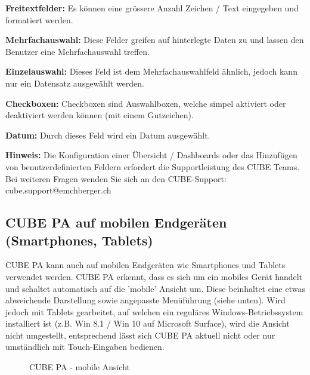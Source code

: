\begin{compactitem}
	\item \textbf{Freitextfelder:} Es können eine grössere Anzahl Zeichen / Text eingegeben und formatiert werden.
	\item \textbf{Mehrfachauswahl:} Diese Felder greifen auf hinterlegte Daten zu und lassen den Benutzer eine Mehrfachauswahl treffen.
	\item \textbf{Einzelauswahl:} Dieses Feld ist dem Mehrfachauswahlfeld ähnlich, jedoch kann nur ein Datensatz ausgewählt werden. 
	\item \textbf{Checkboxen:} Checkboxen sind Auswahlboxen, welche simpel aktiviert oder deaktiviert werden können (mit einem Gutzeichen).
	\item \textbf{Datum:} Durch dieses Feld wird ein Datum ausgewählt.
\end{compactitem}

\vspace{\baselineskip}

\textbf{Hinweis:} Die Konfiguration einer Übersicht / Dashboards oder das Hinzufügen von benutzerdefinierten Feldern erfordert die Supportleistung des CUBE Teams. Bei weiteren Fragen wenden Sie sich an den CUBE-Support: {\color{red} cube.support@emchberger.ch}

\pagebreak
\subsection{CUBE PA auf mobilen Endgeräten (Smartphones, Tablets)}

CUBE PA kann auch auf mobilen Endgeräten wie Smartphones und Tablets verwendet werden. CUBE PA erkennt, dass es sich um ein mobiles Gerät handelt und schaltet automatisch auf die 'mobile' Ansicht um. Diese beinhaltet eine etwas abweichende Darstellung sowie angepasste Menüführung (siehe unten). Wird jedoch mit Tablets gearbeitet, auf welchen ein reguläres Windows-Betriebssystem installiert ist (z.B. Win 8.1 / Win 10 auf Microsoft Surface), wird die Ansicht nicht umgestellt, entsprechend lässt sich CUBE PA aktuell nicht oder nur umständlich mit Touch-Eingaben bedienen.


\begin{figure}[H]
\caption{CUBE PA - mobile Ansicht}
\end{figure}

